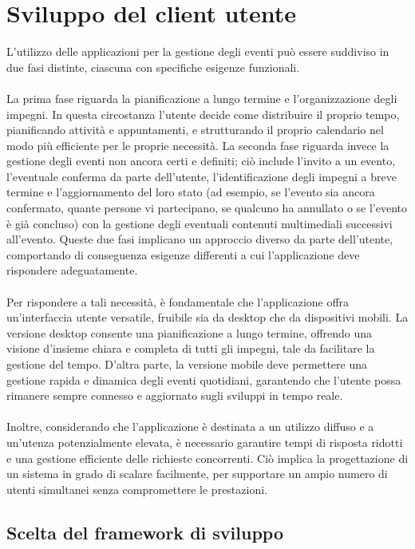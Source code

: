 \section{Sviluppo del client utente}
L'utilizzo delle applicazioni per la gestione degli eventi
può essere suddiviso in due fasi distinte,
ciascuna con specifiche esigenze funzionali.\\
\\
La prima fase riguarda la pianificazione a lungo termine e l'organizzazione degli impegni.
In questa circostanza l'utente decide come distribuire il proprio tempo,
pianificando attività e appuntamenti,
e strutturando il proprio calendario nel modo più efficiente per le proprie necessità.
La seconda fase riguarda invece la gestione degli eventi non ancora certi e definiti;
ciò include l'invito a un evento, l'eventuale conferma da parte dell'utente,
l'identificazione degli impegni a breve termine e l'aggiornamento del loro stato
(ad esempio, se l'evento sia ancora confermato, quante persone vi partecipano,
se qualcuno ha annullato o se l'evento è già concluso)
con la gestione degli eventuali contenuti multimediali successivi all'evento.
Queste due fasi implicano un approccio diverso da parte dell'utente,
comportando di conseguenza esigenze differenti
a cui l'applicazione deve rispondere adeguatamente.\\
\\
Per rispondere a tali necessità,
è fondamentale che l'applicazione offra un'interfaccia utente versatile,
fruibile sia da desktop che da dispositivi mobili.
La versione desktop consente una pianificazione a lungo termine,
offrendo una visione d'insieme chiara e completa di tutti gli impegni,
tale da facilitare la gestione del tempo.
D'altra parte, la versione mobile deve permettere una gestione rapida e dinamica degli eventi quotidiani,
garantendo che l'utente possa rimanere sempre connesso e aggiornato sugli sviluppi in tempo reale.\\
\\
Inoltre, considerando che l'applicazione è destinata
a un utilizzo diffuso e a un'utenza potenzialmente elevata,
è necessario garantire tempi di risposta ridotti e
una gestione efficiente delle richieste concorrenti.
Ciò implica la progettazione di un sistema in grado di scalare facilmente,
per supportare un ampio numero di utenti simultanei senza compromettere le prestazioni.
\clearpage
\subsection{Scelta del framework di sviluppo}

